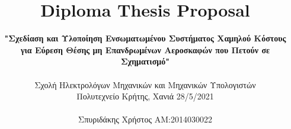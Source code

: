\documentclass[a4paper, 10pt, conference]{ieeeconf}      %
\title{\LARGE \bf
Diploma Thesis Proposal
}
\author{\textbf{"Σχεδίαση και Υλοποίηση Ενσωματωμένου Συστήματος Χαμηλού Κόστους}
\\\textbf{για Εύρεση Θέσης μη Επανδρωμένων Αεροσκαφών που Πετούν σε Σχηματισμό"}
\\
\\ Σχολή Ηλεκτρολόγων Μηχανικών και Μηχανικών Υπολογιστών 
\\ Πολυτεχνείο Κρήτης, Χανιά 28/5/2021
\\
\\ Σπυριδάκης Χρήστος AM:2014030022
}
\begin{document}
\maketitle
\thispagestyle{plain}
\pagestyle{plain}









\begin{thebibliography}{99}

\end{thebibliography}
\end{document}
